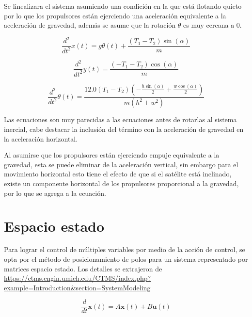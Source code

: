 \documentclass[titlepage, letterpaper]{article}
\begin{document}
Se linealizara el sistema asumiendo una condición en la que está flotando quieto por lo que los propulsores están ejerciendo una aceleración equivalente a la aceleración de gravedad, además se asume que la rotación $\theta$ es muy cercana a 0.

\begin{equation*}\frac{d^{2}}{d t^{2}} x{\left(t \right)} = g \theta{\left(t \right)} + \frac{\left(T_{1} - T_{2}\right) \sin{\left(\alpha \right)}}{m}\end{equation*}

\begin{equation*}\frac{d^{2}}{d t^{2}} y{\left(t \right)} = \frac{\left(- T_{1} - T_{2}\right) \cos{\left(\alpha \right)}}{m}\end{equation*}

\begin{equation*}\frac{d^{2}}{d t^{2}} \theta{\left(t \right)} = \frac{12.0 \left(T_{1} - T_{2}\right) \left(- \frac{h \sin{\left(\alpha \right)}}{2} + \frac{w \cos{\left(\alpha \right)}}{2}\right)}{m \left(h^{2} + w^{2}\right)}\end{equation*}

Las ecuaciones son muy parecidas a las ecuaciones antes de rotarlas al sistema inercial, cabe destacar la inclusión del término con la aceleración de gravedad en la aceleración horizontal.

Al asumirse que los propulsores están ejerciendo empuje equivalente a la gravedad, esta se puede eliminar de la aceleración vertical, sin embargo para el movimiento horizontal esto tiene el efecto de que si el satélite está inclinado, existe un componente horizontal de los propulsores proporcional a la gravedad, por lo que se agrega a la ecuación.

\section{Espacio estado}

Para lograr el control de múltiples variables por medio de la acción de control, se opta por el método de posicionamiento de polos para un sistema representado por matrices espacio estado. Los detalles se extrajeron de \url{https://ctms.engin.umich.edu/CTMS/index.php?example=Introduction&section=SystemModeling}

\begin{equation*}
	\frac{d}{d t} \pmb{x}{\left(t \right)}
	= A\pmb{x}(t) + B \pmb{u}(t)
\end{equation*}
\end{document}
